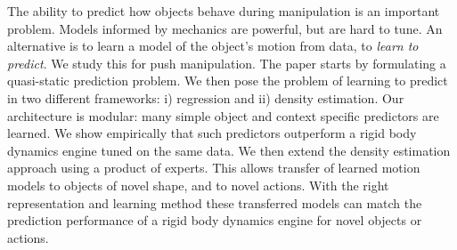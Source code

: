 The ability to predict how objects behave during manipulation is an important problem.  Models informed by mechanics are powerful, but are hard to tune.  An alternative is to learn a model of the object's motion from data, to {\em learn to predict}. We study this for push manipulation. The paper starts by formulating a quasi-static prediction problem. We then pose the problem of learning to predict in two different frameworks: i) regression and ii) density estimation. Our architecture is modular: many simple object and context specific predictors are learned. We show empirically that such predictors outperform a rigid body dynamics engine tuned on the same data.  We then extend the density estimation approach using a product of experts. This allows transfer of learned motion models to objects of novel shape, and to novel actions. With the right representation and learning method these transferred models can match the prediction performance of a rigid body dynamics engine for novel objects or actions.